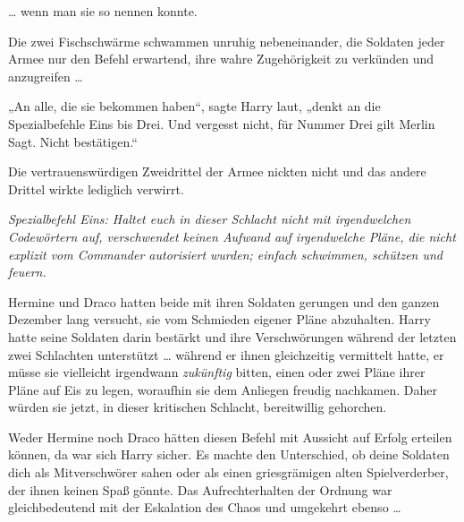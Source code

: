… wenn man sie so nennen konnte.

Die zwei Fischschwärme schwammen unruhig nebeneinander, die Soldaten jeder Armee nur den Befehl erwartend, ihre wahre Zugehörigkeit zu verkünden und anzugreifen …

„An alle, die sie bekommen haben“, sagte Harry laut, „denkt an die Spezialbefehle Eins bis Drei. Und vergesst nicht, für Nummer Drei gilt Merlin Sagt. Nicht bestätigen.“

Die vertrauenswürdigen Zweidrittel der Armee nickten nicht und das andere Drittel wirkte lediglich verwirrt.

\emph{Spezialbefehl Eins: Haltet euch in dieser Schlacht nicht mit irgendwelchen Codewörtern auf, verschwendet keinen Aufwand auf irgendwelche Pläne, die nicht explizit vom Commander autorisiert wurden; einfach schwimmen, schützen und feuern.}

Hermine und Draco hatten beide mit ihren Soldaten gerungen und den ganzen Dezember lang versucht, sie vom Schmieden eigener Pläne abzuhalten. Harry hatte seine Soldaten darin bestärkt und ihre Verschwörungen während der letzten zwei Schlachten unterstützt … während er ihnen gleichzeitig vermittelt hatte, er müsse sie vielleicht irgendwann \emph{zukünftig} bitten, einen oder zwei Pläne ihrer Pläne auf Eis zu legen, woraufhin sie dem Anliegen freudig nachkamen. Daher würden sie jetzt, in dieser kritischen Schlacht, bereitwillig gehorchen.

Weder Hermine noch Draco hätten diesen Befehl mit Aussicht auf Erfolg erteilen können, da war sich Harry sicher. Es machte den Unterschied, ob deine Soldaten dich als Mitverschwörer sahen oder als einen griesgrämigen alten Spielverderber, der ihnen keinen Spaß gönnte. Das Aufrechterhalten der Ordnung war gleichbedeutend mit der Eskalation des Chaos und umgekehrt ebenso …

